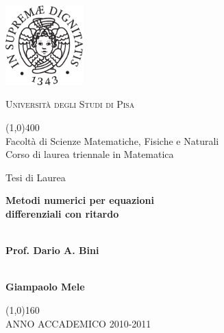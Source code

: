 \begin{titlepage}


\begin{center}


\vspace{3cm}
\includegraphics[width=3cm]{immagini/cherubino.pdf}
\vspace{1cm}


\textsc{\Huge Universit\`a degli Studi di Pisa\\}


\vspace{0.3cm}

\line(1,0){400}
\vspace{0.3cm}\\
\Large{
Facoltà di Scienze Matematiche, Fisiche e Naturali	\\ [0.3cm]
Corso di laurea triennale in Matematica
}


\vspace{3cm}

\Large{ Tesi di Laurea }

{
\Huge
\textbf{
	  Metodi numerici per equazioni	\\ [0.5cm] 
	  differenziali con ritardo
	  }
}



\end{center}

\vspace{2cm}
\begin{minipage}{5cm}
\\ \vspace{-0.0cm} \textbf{{\large Prof. Dario A. Bini}}
\end{minipage}
\hspace{3cm}
\begin{minipage}{5cm}
\\ \vspace{-0.0cm} \textbf{{\large Giampaolo Mele}} \\
\end{minipage}

\vspace{3.5cm}
\begin{center}
 \line(1,0){160}
\vspace{0.3cm}\\
ANNO ACCADEMICO 2010-2011
\end{center}

\end{titlepage}
